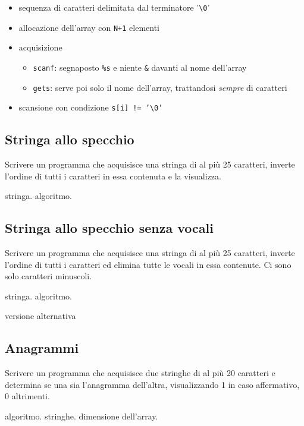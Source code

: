 \begin{itemize}
\item sequenza di caratteri delimitata dal terminatore '\texttt{\textbackslash 0}'
\item allocazione dell'array con \texttt{N+1} elementi
\item acquisizione    \begin{itemize}
	\item \texttt{scanf}: segnaposto \texttt{\%s} e niente \texttt{\&} davanti al nome dell'array
	\item \texttt{gets}: serve poi solo il nome dell'array, trattandosi \textit{sempre} di caratteri
    \end{itemize}
\item scansione con condizione \texttt{s[i] != '\textbackslash 0'}
\end{itemize}
\mysep{}

\subsection{Stringa allo specchio}
Scrivere un programma che acquisisce una stringa di al pi\`u 25 caratteri, inverte l'ordine di tutti i caratteri in essa contenuta e la visualizza.

\begin{tags}
stringa. algoritmo.
\end{tags}


\subsection{Stringa allo specchio senza vocali}
Scrivere un programma che acquisisce una stringa di al pi\`u 25 caratteri, inverte l'ordine di tutti i caratteri ed elimina tutte le vocali in essa contenute. Ci sono solo caratteri minuscoli.

\begin{tags}
stringa. algoritmo.
\end{tags}


versione alternativa


\subsection{Anagrammi}
Scrivere un programma che acquisisce due stringhe di al pi\`u 20 caratteri e determina se una sia l'anagramma dell'altra, visualizzando 1 in caso affermativo, 0 altrimenti.
\begin{tags}
algoritmo. stringhe. dimensione dell'array.
\end{tags}

